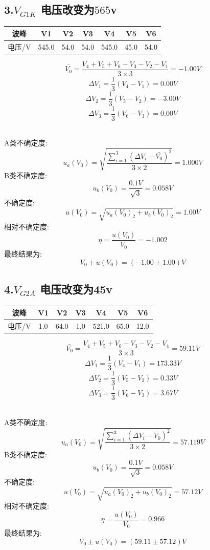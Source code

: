 \documentclass[11pt,a4paper,oneside]{article}
\begin{document}
\subsection*{3.$V_{G1K}$ 电压改变为$565$v}
\begin{center}
\begin{tabular}{|c|c|c|c|c|c|c|}
	\hline
	波峰&V1&V2&V3&V4&V5&V6
	\\\hline
	电压/V&545.0&54.0&54.0&545.0&45.0&54.0\\\hline
	\end{tabular}
	\end{center}

$$  \bar{V_0}=\frac{V_4+V_5+V_6-V_3-V_2-V_1}{3\times 3}=-1.00V $$
$$	\Delta V_1=\frac{1}{3}(V_4-V_1)=0.00V $$
$$	\Delta V_2=\frac{1}{3}(V_5-V_2)=-3.00V $$
$$	\Delta V_3=\frac{1}{3}(V_6-V_3)=0.00V $$ 

\ \\
A类不确定度:
$$	u_a(V_0)=\sqrt{\frac{\sum\limits_{i=1}^{3} (\Delta V_i-\bar{V_0})^2}{3\times 2}}=1.000V $$
B类不确定度:
$$	u_b(V_0)=\frac{0.1V}{\sqrt{3}}=0.058V $$
不确定度:
$$	u(V_0)=\sqrt{u_a(V_0)_2+u_b(V_0)_2}=1.00V $$
相对不确定度:
$$	\eta=\frac{u(V_0)}{V_0}=-1.002 $$
最终结果为:
$$	V_0 \pm u(V_0) = (-1.00 \pm 1.00)V $$


\subsection*{4.$V_{G2A}$ 电压改变为45v}
\begin{center}
\begin{tabular}{|c|c|c|c|c|c|c|}
	\hline
	波峰&V1&V2&V3&V4&V5&V6
	\\\hline
	电压/V&1.0&64.0&1.0&521.0&65.0&12.0\\\hline
	\end{tabular}
	\end{center}

$$  \bar{V_0}=\frac{V_4+V_5+V_6-V_3-V_2-V_4}{3\times 3}=59.11V $$
$$	\Delta V_1=\frac{1}{3}(V_4-V_1)=173.33V $$
$$	\Delta V_2=\frac{1}{3}(V_5-V_2)=0.33V $$
$$	\Delta V_3=\frac{1}{3}(V_6-V_3)=3.67V $$ 

\ \\
A类不确定度:
$$	u_a(V_0)=\sqrt{\frac{\sum\limits_{i=1}^{3} (\Delta V_i-\bar{V_0})^2}{3\times 2}}=57.119V $$
B类不确定度:
$$	u_b(V_0)=\frac{0.1V}{\sqrt{3}}=0.058V $$
不确定度:
$$	u(V_0)=\sqrt{u_a(V_0)_2+u_b(V_0)_2}=57.12V $$
相对不确定度:
$$	\eta=\frac{u(V_0)}{V_0}=0.966 $$
最终结果为:
$$	V_0 \pm u(V_0) = (59.11 \pm 57.12)V $$
\end{document}
